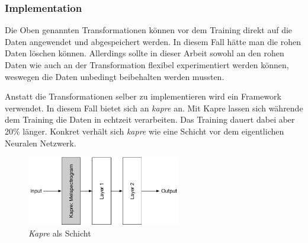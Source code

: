 \subsubsection{Implementation}

Die Oben genannten Transformationen können vor dem Training direkt auf die Daten angewendet und abgespeichert werden. In diesem Fall hätte man die rohen Daten löschen können. Allerdings sollte in dieser Arbeit sowohl an den rohen Daten wie auch an der Transformation flexibel experimentiert werden können, weswegen die Daten unbedingt beibehalten werden mussten. 

Anstatt die Transformationen selber zu implementieren wird ein Framework verwendet. In diesem Fall bietet sich an \textit{kapre}\parencite{kapre} an. Mit Kapre lassen sich währende dem Training die Daten in echtzeit verarbeiten. Das Training dauert dabei aber 20\% länger. Konkret verhält sich \textit{kapre} wie eine Schicht vor dem eigentlichen Neuralen Netzwerk.
\begin{figure}[hbt]
	\centering
		\includegraphics[width=0.6\textwidth]{assets/kapre.png}
	\centering
	\caption{\textit{Kapre}\parencite{kapre} als Schicht}
	\label{img:kapre}
\end{figure}

